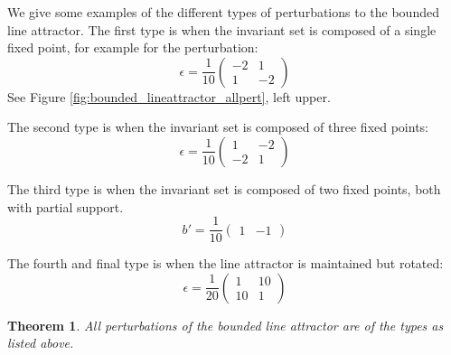 \documentclass{article}
\newtheorem{theorem}{Theorem}
\theoremstyle{definition}
\theoremstyle{remark}
\begin{document}
We give some examples of the different types of perturbations to the bounded line attractor.
The first type is when the invariant set is composed of a single fixed point, for example for the perturbation:
\begin{equation}
\epsilon = \frac{1}{10}
\begin{pmatrix}
-2  &  1 \\
 1   &  -2
\end{pmatrix}
\end{equation}
See Figure \ref{fig:bounded_lineattractor_allpert}, left upper.



The second type is when the invariant set is composed of three fixed points:
\begin{equation}
\epsilon = \frac{1}{10}
\begin{pmatrix}
1  &  -2 \\
 -2  &  1
\end{pmatrix}
\end{equation}

The third type is when the invariant set is composed of two fixed points, both with partial support.
\begin{equation}
b' =  \frac{1}{10}
\begin{pmatrix}
1 & -1
\end{pmatrix}
\end{equation}

The fourth and final type is when the line attractor is maintained but rotated:
\begin{equation}
\epsilon =  \frac{1}{20}
\begin{pmatrix}
1 & 10\\
10 & 1
\end{pmatrix}
\end{equation}

\begin{theorem}
All perturbations of the bounded line attractor are of the types as listed above.
\end{theorem}
\end{document}
